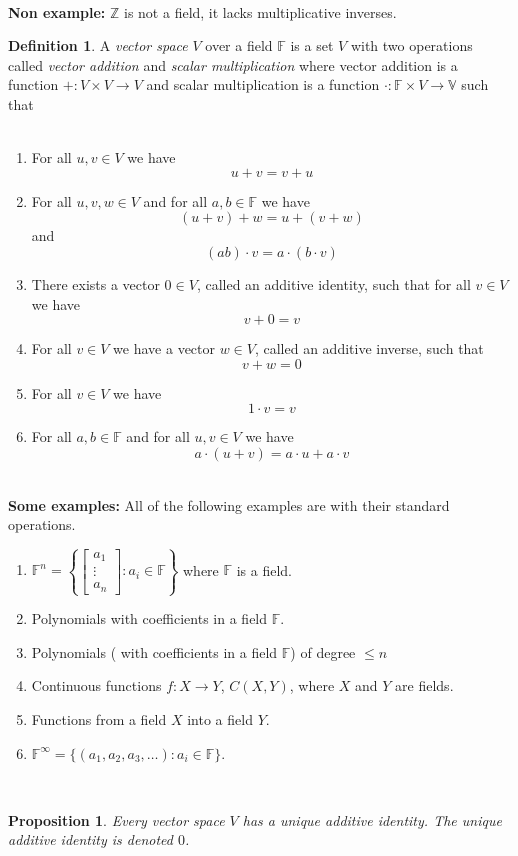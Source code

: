 \documentclass[12pt,letterpaper]{amsart}
\theoremstyle{plain}
\newtheorem{proposition}{Proposition}[section]
\theoremstyle{definition}
\newtheorem{definition}[theorem]{Definition}
\numberwithin{equation}{section}
\begin{document}
\ \\
{\bf Non example: }$\mathbb{Z}$ is not a field, it lacks multiplicative inverses. 
\ \\
\begin{definition} A \emph{vector space} $V$ over a field $\mathbb{F}$ is a set $V$ with two operations called \emph{vector addition} and \emph{scalar multiplication} where vector addition is a function $+:V\times V\rightarrow V$ and scalar multiplication is a function $\cdot: \mathbb{F}\times V\rightarrow \mathbb{V}$ such that 
\\\
\begin{enumerate}[1.] 
\setlength{\itemsep}{5pt}
\item For all $u,v\in V$ we have 
\[u+v=v+u\]
\item For all $u,v,w\in V$ and for all $a,b\in\mathbb{F}$ we have 
\[(u+v)+w=u+(v+w)\]
and 
\[(ab)\cdot v=a\cdot(b\cdot v)\]
\item There exists a vector $0\in V$, called an additive identity, such that for all $v\in V$ we have
\[v+0=v\]

\item For all $v\in V$ we have a vector $w\in V$, called an additive inverse, such that 
\[v+w=0\]
\item For all $v\in V$ we have 
\[1\cdot v=v\]
\item For all $a,b \in \mathbb{F}$ and for all $u,v\in V$ we have
\[a\cdot(u+v)=a\cdot u+a\cdot v\] 
\end{enumerate}
\end{definition}
\ \\
{\bf \noindent Some examples:} All of the following examples are with their standard operations. 
\begin{enumerate}[1.]
\setlength{\itemsep}{5pt}
\item $\mathbb{F}^n=\left\{\begin{bmatrix}a_1\\ \vdots \\ a_n\end{bmatrix}: a_i\in \mathbb{F}\right\}$ where $\mathbb{F}$ is a field. 
\item Polynomials with coefficients in a field $\mathbb{F}$.
\item Polynomials ( with coefficients in a field $\mathbb{F}$) of degree $\leq n$
\item Continuous functions $f:X\rightarrow Y$, $C(X,Y)$, where $X$ and $Y$ are fields. 
\item Functions from a field $X$ into a field $Y$. 
\item $\mathbb{F}^\infty=\{(a_1, a_2, a_3, \ldots): a_i\in \mathbb{F}\}$. 
\end{enumerate}
\ \\
\begin{proposition}Every vector space $V$ has a unique additive identity. The unique additive identity is denoted $0$. 
\end{proposition}
\end{document}
